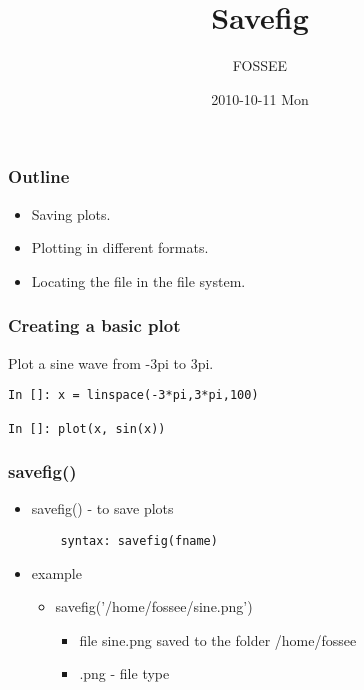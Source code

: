 \documentclass[presentation]{beamer}
\title{Savefig}
\author{FOSSEE}
\date{2010-10-11 Mon}
\begin{document}
\maketitle









\begin{frame}
\frametitle{Outline}
\label{sec-1}

\begin{itemize}
\item Saving plots.
\item Plotting in different formats.
\item Locating the file in the file system.
\end{itemize}
\end{frame}
\begin{frame}[fragile]
\frametitle{Creating a basic plot}
\label{sec-2}

  Plot a sine wave from -3pi to 3pi.
\begin{verbatim}
In []: x = linspace(-3*pi,3*pi,100)

In []: plot(x, sin(x))
\end{verbatim}
\end{frame}
\begin{frame}[fragile]
\frametitle{savefig()}
\label{sec-3}
\begin{itemize}

\item savefig() - to save plots
\label{sec-3_1}%
\begin{verbatim}
    syntax: savefig(fname)
\end{verbatim}


\item example
\label{sec-3_2}%
\begin{itemize}

\item savefig('/home/fossee/sine.png')
\label{sec-3_2_1}%
\begin{itemize}
\item file sine.png saved to the folder /home/fossee
\item .png - file type
\end{itemize}


\end{itemize} %
\end{itemize} %
\end{frame}
\end{document}
